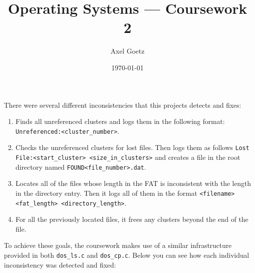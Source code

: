 \documentclass[10pt,a4paper]{article}
\begin{document}
\title{Operating Systems --- Coursework 2}
\author{Axel Goetz}
\date{\today}

\maketitle

There were several different inconsistencies that this projects detects and fixes:
\begin{enumerate}
  \item Finds all unreferenced clusters and logs them in the following format: \texttt{Unreferenced:<cluster\_number>}.
  \item Checks the unreferenced clusters for lost files. Then logs them as follows \texttt{Lost File:<start\_cluster> <size\_in\_clusters>} and creates a file in the root directory named \texttt{FOUND<file\_number>.dat}.
  \item Locates all of the files whose length in the FAT is inconsistent with the length in the directory entry. Then it logs all of them in the format \texttt{<filename> <fat\_length> <directory\_length>}.
  \item For all the previously located files, it frees any clusters beyond the end of the file.
\end{enumerate}

To achieve these goals, the coursework makes use of a similar infrastructure provided in both \texttt{dos\_ls.c} and \texttt{dos\_cp.c}. Below you can see how each individual inconsistency was detected and fixed:
\end{document}
